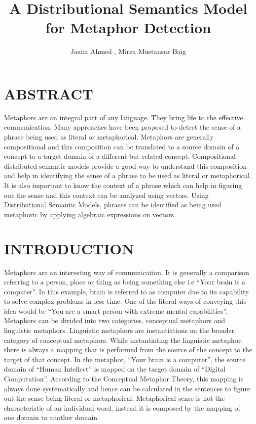 \documentclass[a4paper]{article}
\title{\LARGE \bf 
A Distributional Semantics Model for Metaphor Detection
}
\author{ Jasim Ahmed , Mirza Mustansar Baig}
\affil { Department of Computer Science,  Universität Passau }
\begin{document}
\maketitle

\section{ABSTRACT}
Metaphors are an integral part of any language. They bring life to the effective communication. Many approaches have been proposed to detect the sense of a phrase being used as literal or metaphorical. Metaphors are generally compositional and this composition can be translated to a source domain of a concept to a target domain of a different but related concept. Compositional distributed semantic models provide a good way to understand this composition and help in identifying the sense of a phrase to be used as literal or metaphorical. It is also important to know the context of a phrase which can help in figuring out the sense and this context can be analyzed using vectors. Using Distributional Semantic Models, phrases can be identified as being used  metaphoric by applying algebraic expressions on vectors.

\section{INTRODUCTION}
Metaphors are an interesting way of communication. It is generally a comparison referring to a person, place or thing as being something else i.e “Your brain is a computer”. In this example, brain is referred to as computer due to its capability to solve complex problems in less time. One of the literal ways of conveying this idea would be “You are a smart person with extreme mental capabilities”. Metaphors can be divided into two categories, conceptual metaphors and linguistic metaphors. Linguistic metaphors are instantiations on the broader category of conceptual metaphors. While instantiating the linguistic metaphor, there is always a mapping that is performed from the source of the concept to the target of that concept. In the metaphor, “Your brain is a computer”, the source domain of “Human Intellect” is mapped on the target domain of “Digital Computation”. According to the Conceptual Metaphor Theory, this mapping is always done systematically and hence can be calculated in the sentences to figure out the sense being literal or metaphorical. Metaphorical sense is not the characteristic of an individual word, instead it is composed by the mapping of one domain to another domain. \\
\end{document}
